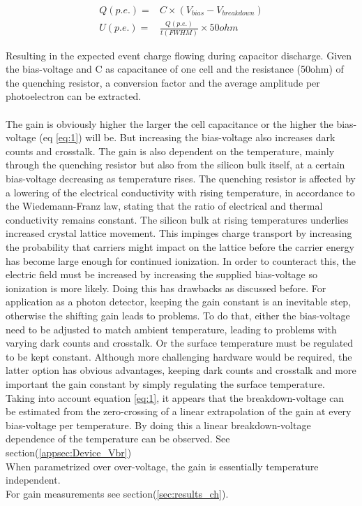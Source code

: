 \documentclass[12pt,article,type=msc,colorback,accentcolor=tud9c]{tudthesis}
\begin{document}
\begin{equation}\label{eq:2}
\begin{split}
Q(p.e.) = & C \times (V_{bias}-V_{breakdown})\\
U(p.e.) = & \frac{Q(p.e.)}{t(FWHM)} \times 50ohm
\end{split}
\end{equation}


Resulting in the expected event charge flowing during capacitor discharge. Given the bias-voltage and C as capacitance of one cell and the resistance (50ohm) of the quenching resistor, a conversion factor and the average amplitude per photoelectron can be extracted.\\\\
The gain is obviously higher the larger the cell capacitance or the higher the bias-voltage (eq \ref{eq:1}) will be. But increasing the bias-voltage also increases dark counts and crosstalk. 
The gain is also dependent on the temperature, mainly through the quenching resistor but also from the silicon bulk itself, at a certain bias-voltage decreasing as temperature rises. The quenching resistor is affected by a lowering of the electrical conductivity with rising temperature, in accordance to the Wiedemann-Franz law, stating that the ratio of electrical and thermal conductivity remains constant. The silicon bulk at rising temperatures underlies increased crystal lattice movement. This impinges charge transport by increasing the probability that carriers might impact on the lattice before the carrier energy has become large enough for continued ionization. In order to counteract this, the electric field must be increased by increasing the supplied bias-voltage so ionization is more likely. Doing this has drawbacks as discussed before. For application as a photon detector, keeping the gain constant is an inevitable step, otherwise the shifting gain leads to problems. To do that, either the bias-voltage need to be adjusted to match ambient temperature, leading to problems with varying dark counts and crosstalk. Or the surface temperature must be regulated to be kept constant. Although more challenging hardware would be required, the latter option has obvious advantages, keeping dark counts and crosstalk and more important the gain constant by simply regulating the surface temperature.\\
Taking into account equation \ref{eq:1}, it appears that the breakdown-voltage can be estimated from the zero-crossing of a linear extrapolation of the gain at every bias-voltage per temperature. By doing this a linear breakdown-voltage dependence of the temperature can be observed. See section(\ref{appsec:Device_Vbr})\\
When parametrized over over-voltage, the gain is essentially temperature independent.\\
For gain measurements see section(\ref{sec:results_ch}).
\end{document}
